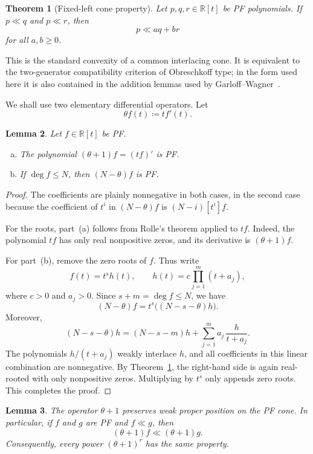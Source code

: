 \documentclass[reqno]{amsart}
\numberwithin{equation}{section}
\newtheorem{theorem}{Theorem}[section]
\newtheorem{lemma}[theorem]{Lemma}
\theoremstyle{definition}
\newcommand{\setR}{\mathbb{R}}
\newcommand{\poly}{\setR[t]}
\newcommand{\coeff}[2]{[#1]#2}
\begin{document}
\begin{theorem}[Fixed-left cone property]
\label{thm:fixedLeftCone}
Let $p,q,r\in\poly$ be PF polynomials.  If $p\ll q$ and $p\ll r$, then
\[
  p\ll aq+br
\]
for all $a,b\geq 0$.
\end{theorem}

This is the standard convexity of a common interlacing cone.  It is equivalent
to the two-generator compatibility criterion of Obreschkoff type; in the form
used here it is also contained in the addition lemmas used by
Garloff--Wagner~\cite[Lem.~6]{GarloffWagner1996}.

We shall use two elementary differential operators.  Let
\[
  \theta f(t)\coloneqq t f'(t).
\]

\begin{lemma}
\label{lem:operatorsPreservePF}
Let $f\in\poly$ be PF.
\begin{enumerate}[(a)]
\item The polynomial $(\theta+1)f=(tf)'$ is PF.
\item If $\deg f\leq N$, then $(N-\theta)f$ is PF.
\end{enumerate}
\end{lemma}

\begin{proof}
The coefficients are plainly nonnegative in both cases, in the second case
because the coefficient of $t^i$ in $(N-\theta)f$ is $(N-i)\coeff{t^i}f$.

For the roots, part~(a) follows from Rolle's theorem applied to $tf$.  Indeed,
the polynomial $tf$ has only real nonpositive zeros, and its derivative is
$(\theta+1)f$.

For part~(b), remove the zero roots of $f$.  Thus write
\[
  f(t)=t^s h(t),\qquad
  h(t)=c\prod_{j=1}^{m}(t+a_j),
\]
where $c>0$ and $a_j>0$.  Since $s+m=\deg f\leq N$, we have
\[
  (N-\theta)f
  =
  t^s\bigl((N-s-\theta)h\bigr).
\]
Moreover,
\[
  (N-s-\theta)h
  =
  (N-s-m)h+\sum_{j=1}^{m}a_j\,\frac{h}{t+a_j}.
\]
The polynomials $h/(t+a_j)$ weakly interlace $h$, and all coefficients in
this linear combination are nonnegative.  By
Theorem~\ref{thm:fixedLeftCone}, the right-hand side is again real-rooted
with only nonpositive zeros.  Multiplying by $t^s$ only appends zero roots.
This completes the proof.
\end{proof}

\begin{lemma}
\label{lem:thetaPlusOnePreservesInterlacing}
The operator $\theta+1$ preserves weak proper position on the PF cone.  In
particular, if $f$ and $g$ are PF and $f\ll g$, then
\[
  (\theta+1)f\ll(\theta+1)g.
\]
Consequently, every power $(\theta+1)^r$ has the same property.
\end{lemma}
\end{document}
